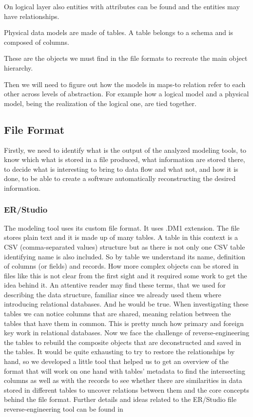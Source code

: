 On logical layer also entities with attributes can be found and the entities may have relationships.

Physical data models are made of tables. A table belongs to a schema and is composed of columns.

These are the objects we must find in the file formats to recreate the main object hierarchy.

Then we will need to figure out how the models in maps-to relation refer to each other across levels of abstraction. For example how a logical model and a physical model, being the realization of the logical one, are tied together.

\subsection{File Format}

Firstly, we need to identify what is the output of the analyzed modeling tools, to know which what is stored in a file produced, what information are stored there, to decide what is interesting to bring to data flow and what not, and how it is done, to be able to create a software automatically reconstructing the desired information.

\subsubsection{ER/Studio}
\label{subsec:dm1_format}
The modeling tool uses its custom file format. It uses .DM1 extension. The file stores plain text and it is made up of many tables. A table in this context is a CSV (comma-separated values) structure but as there is not only one CSV table identifying name is also included. So by table we understand its name, definition of columns (or fields) and records.
How more complex objects can be stored in files like this is not clear from the first sight and it required some work to get the idea behind it.  
An attentive reader may find these terms, that we used for describing the data structure, familiar since we already used them where introducing relational databases. And he would be true. When investigating these tables we can notice columns that are shared, meaning relation between the tables that have them in common. This is pretty much how primary and foreign key work in relational databases.
Now we face the challenge of reverse-engineering the tables to rebuild the composite objects that are deconstructed and saved in the tables.
It would be quite exhausting to try to restore the relationships by hand, so we developed a little tool that helped us to get an overview of the format that will work on one hand with tables' metadata to find the intersecting columns as well as with the records to see whether there are similarities in data stored in different tables to uncover relations between them and the core concepts behind the file format.
Further details and ideas related to the ER/Studio file reverse-engineering tool can be found in 

